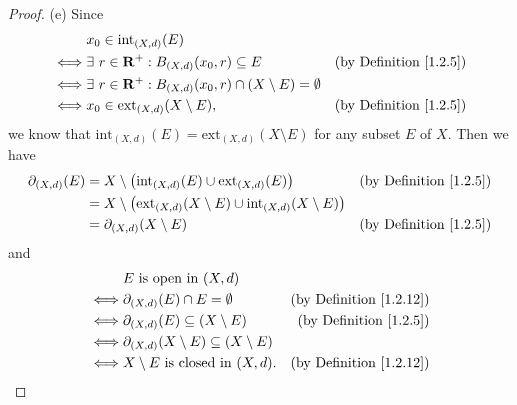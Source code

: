 \begin{proof}{(e)}
    Since
    \begin{align*}
             & x_0 \in \text{int}_{(X, d)}(E)                                                                                         \\
        \iff & \exists\ r \in \mathbf{R}^+ : B_{(X, d)}(x_0, r) \subseteq E                      & \text{(by Definition \ref{1.2.5})} \\
        \iff & \exists\ r \in \mathbf{R}^+ : B_{(X, d)}(x_0, r) \cap (X \setminus E) = \emptyset                                      \\
        \iff & x_0 \in \text{ext}_{(X, d)}(X \setminus E),                                       & \text{(by Definition \ref{1.2.5})}
    \end{align*}
    we know that \(\text{int}_{(X, d)}(E) = \text{ext}_{(X, d)}(X \setminus E)\) for any subset \(E\) of \(X\).
    Then we have
    \begin{align*}
        \partial_{(X, d)}(E) & = X \setminus \big(\text{int}_{(X, d)}(E) \cup \text{ext}_{(X, d)}(E)\big)                         & \text{(by Definition \ref{1.2.5})} \\
                             & = X \setminus \big(\text{ext}_{(X, d)}(X \setminus E) \cup \text{int}_{(X, d)}(X \setminus E)\big)                                      \\
                             & = \partial_{(X, d)}(X \setminus E)                                                                 & \text{(by Definition \ref{1.2.5})}
    \end{align*}
    and
    \begin{align*}
             & E \text{ is open in } (X, d)                                                                     \\
        \iff & \partial_{(X, d)}(E) \cap E = \emptyset                    & \text{(by Definition \ref{1.2.12})} \\
        \iff & \partial_{(X, d)}(E) \subseteq (X \setminus E)             & \text{(by Definition \ref{1.2.5})}  \\
        \iff & \partial_{(X, d)}(X \setminus E) \subseteq (X \setminus E)                                       \\
        \iff & X \setminus E \text{ is closed in } (X, d).                & \text{(by Definition \ref{1.2.12})}
    \end{align*}
\end{proof}

